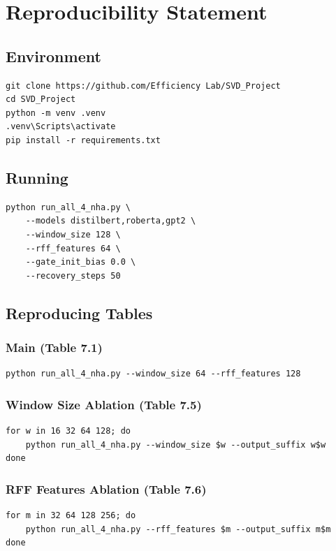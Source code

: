 
\section{Reproducibility Statement}

\subsection{Environment}

\begin{lstlisting}
git clone https://github.com/Efficiency Lab/SVD_Project
cd SVD_Project
python -m venv .venv
.venv\Scripts\activate
pip install -r requirements.txt
\end{lstlisting}

\subsection{Running}

\begin{lstlisting}
python run_all_4_nha.py \
    --models distilbert,roberta,gpt2 \
    --window_size 128 \
    --rff_features 64 \
    --gate_init_bias 0.0 \
    --recovery_steps 50
\end{lstlisting}

\subsection{Reproducing Tables}

\subsubsection{Main (Table 7.1)}
\begin{lstlisting}
python run_all_4_nha.py --window_size 64 --rff_features 128
\end{lstlisting}

\subsubsection{Window Size Ablation (Table 7.5)}
\begin{lstlisting}
for w in 16 32 64 128; do
    python run_all_4_nha.py --window_size $w --output_suffix w$w
done
\end{lstlisting}

\subsubsection{RFF Features Ablation (Table 7.6)}
\begin{lstlisting}
for m in 32 64 128 256; do
    python run_all_4_nha.py --rff_features $m --output_suffix m$m
done
\end{lstlisting}

